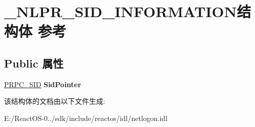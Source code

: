 \hypertarget{struct___n_l_p_r___s_i_d___i_n_f_o_r_m_a_t_i_o_n}{}\section{\+\_\+\+N\+L\+P\+R\+\_\+\+S\+I\+D\+\_\+\+I\+N\+F\+O\+R\+M\+A\+T\+I\+O\+N结构体 参考}
\label{struct___n_l_p_r___s_i_d___i_n_f_o_r_m_a_t_i_o_n}
\subsection*{Public 属性}
\begin{DoxyCompactItemize}
\item 
\mbox{\label{struct___n_l_p_r___s_i_d___i_n_f_o_r_m_a_t_i_o_n_ac7931ce66af53c1817bd79fea67b4944}} 
\hyperlink{struct___r_p_c___s_i_d}{P\+R\+P\+C\+\_\+\+S\+ID} {\bfseries Sid\+Pointer}
\end{DoxyCompactItemize}


该结构体的文档由以下文件生成\+:\begin{DoxyCompactItemize}
\item 
E\+:/\+React\+O\+S-\/0../sdk/include/reactos/idl/netlogon.\+idl\end{DoxyCompactItemize}
